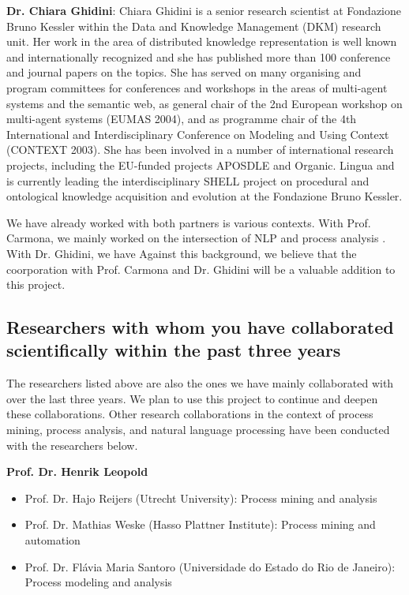 \textbf{Dr. Chiara Ghidini}: Chiara Ghidini is a senior research scientist at Fondazione Bruno Kessler within the Data and Knowledge Management (DKM) research unit. Her work in the area of distributed knowledge representation is well known and internationally recognized and she has published more than 100 conference and journal papers on the topics. She has served on many organising and program committees for conferences and workshops in the areas of multi-agent systems and the semantic web, as general chair of the 2nd European workshop on multi-agent systems (EUMAS 2004), and as programme chair of the 4th International and Interdisciplinary Conference on Modeling and Using Context (CONTEXT 2003). She has been involved in a number of international research projects, including the EU-funded projects APOSDLE and Organic. Lingua and is currently leading the interdisciplinary SHELL project on procedural and ontological knowledge acquisition and evolution at the Fondazione Bruno Kessler. 

We have already worked with both partners is various contexts. With Prof. Carmona, we mainly worked on the intersection of NLP and process analysis \cite{sanchez2018aligning,van2018challenges}.  With Dr. Ghidini, we have  Against this background, we believe that the coorporation with Prof. Carmona and Dr. Ghidini will be a valuable addition to this project. 

\subsection{Researchers with whom you have collaborated scientifically within the past three years}


The researchers listed above are also the ones we have mainly collaborated with over the last three years. We plan to use this project to continue and deepen these collaborations. Other research collaborations in the context of process mining, process analysis, and natural language processing have been conducted with the researchers below.

\textbf{Prof. Dr. Henrik Leopold}

\begin{itemize}
\item Prof. Dr. Hajo Reijers (Utrecht University): Process mining and analysis
\item Prof. Dr. Mathias Weske (Hasso Plattner Institute): Process mining and automation
\item Prof. Dr. Flávia Maria Santoro (Universidade do Estado do Rio de Janeiro): Process modeling and analysis
\end{itemize}

